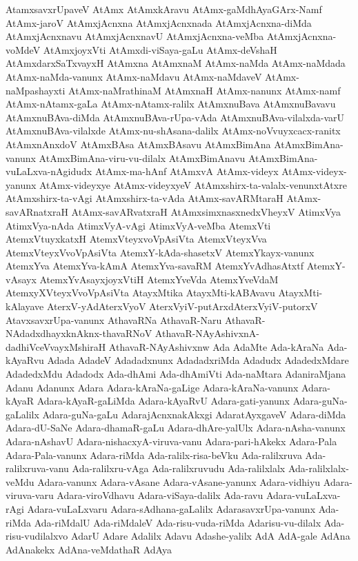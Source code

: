{AtamxsavxrUpaveV
AtAmx
AtAmxkAravu
AtAmx-gaMdhAyaGArx-Namf
AtAmx-jaroV
AtAmxjAcnxna
AtAmxjAcnxnada
AtAmxjAcnxna-diMda
AtAmxjAcnxnavu
AtAmxjAcnxnavU
AtAmxjAcnxna-veMba
AtAmxjAcnxna-voMdeV
AtAmxjoyxVti
AtAmxdi-viSaya-gaLu
AtAmx-deVshaH
AtAmxdarxSaTxvayxH
AtAmxna
AtAmxnaM
AtAmx-naMda
AtAmx-naMdada
AtAmx-naMda-vanunx
AtAmx-naMdavu
AtAmx-naMdaveV
AtAmx-naMpashayxti
AtAmx-naMrathinaM
AtAmxnaH
AtAmx-nanunx
AtAmx-namf
AtAmx-nAtamx-gaLa
AtAmx-nAtamx-ralilx
AtAmxnuBava
AtAmxnuBavavu
AtAmxnuBAva-diMda
AtAmxnuBAva-rUpa-vAda
AtAmxnuBAva-vilalxda-varU
AtAmxnuBAva-vilalxde
AtAmx-nu-shAsana-dalilx
AtAmx-noVvuyxcacx-ranitx
AtAmxnAnxdoV
AtAmxBAsa
AtAmxBAsavu
AtAmxBimAna
AtAmxBimAna-vanunx
AtAmxBimAna-viru-vu-dilalx
AtAmxBimAnavu
AtAmxBimAna-vuLaLxva-nAgidudx
AtAmx-ma-hAnf
AtAmxvA
AtAmx-videyx
AtAmx-videyx-yanunx
AtAmx-videyxye
AtAmx-videyxyeV
AtAmxshirx-ta-valalx-venunxtAtxre
AtAmxshirx-ta-vAgi
AtAmxshirx-ta-vAda
AtAmx-savARMtaraH
AtAmx-savARnatxraH
AtAmx-savARvatxraH
AtAmxsimxnasxnedxVheyxV
AtimxVya
AtimxVya-nAda
AtimxVyA-vAgi
AtimxVyA-veMba
AtemxVti
AtemxVtuyxkatxH
AtemxVteyxvoVpAsiVta
AtemxVteyxVva
AtemxVteyxVvoVpAsiVta
AtemxY-kAda-shasetxV
AtemxYkayx-vanunx
AtemxYva
AtemxYva-kAmA
AtemxYva-savaRM
AtemxYvAdhasAtxtf
AtemxY-vAsayx
AtemxYvAsayxjoyxVtiH
AtemxYveVda
AtemxYveVdaM
AtemxyXVteyxVvoVpAsiVta
AtayxMtika
AtayxMti-kABAvavu
AtayxMti-kAlayave
AterxV-yAdAterxVyoV
AterxVyiV-putArxdAterxVyiV-putorxV
AtavxsavxrUpa-vanunx
AthavaRNa
AthavaR-Naru
AthavaR-NAdadxdhayxknAknx-thavaRNoV
AthavaR-NAyAshivxnA-dadhiVceVvayxMshiraH
AthavaR-NAyAshivxnw
Ada
AdaMte
Ada-kAraNa
Ada-kAyaRvu
Adada
AdadeV
Adadadxnunx
AdadadxriMda
Adadudx
AdadedxMdare
AdadedxMdu
Adadodx
Ada-dhAmi
Ada-dhAmiVti
Ada-naMtara
AdaniraMjana
Adanu
Adanunx
Adara
Adara-kAraNa-gaLige
Adara-kAraNa-vanunx
Adara-kAyaR
Adara-kAyaR-gaLiMda
Adara-kAyaRvU
Adara-gati-yanunx
Adara-guNa-gaLalilx
Adara-guNa-gaLu
AdarajAcnxnakAkxgi
AdaratAyxgaveV
Adara-diMda
Adara-dU-SaNe
Adara-dhamaR-gaLu
Adara-dhAre-yalUlx
Adara-nAsha-vanunx
Adara-nAshavU
Adara-nishacxyA-viruva-vanu
Adara-pari-hAkekx
Adara-Pala
Adara-Pala-vanunx
Adara-riMda
Ada-ralilx-risa-beVku
Ada-ralilxruva
Ada-ralilxruva-vanu
Ada-ralilxru-vAga
Ada-ralilxruvudu
Ada-ralilxlalx
Ada-ralilxlalx-veMdu
Adara-vanunx
Adara-vAsane
Adara-vAsane-yanunx
Adara-vidhiyu
Adara-viruva-varu
Adara-viroVdhavu
Adara-viSaya-dalilx
Ada-ravu
Adara-vuLaLxva-rAgi
Adara-vuLaLxvaru
Adara-sAdhana-gaLalilx
AdarasavxrUpa-vanunx
Ada-riMda
Ada-riMdalU
Ada-riMdaleV
Ada-risu-vuda-riMda
Adarisu-vu-dilalx
Ada-risu-vudilalxvo
AdarU
Adare
Adalilx
Adavu
Adashe-yalilx
AdA
AdA-gale
AdAna
AdAnakekx
AdAna-veMdathaR
AdAya
}
